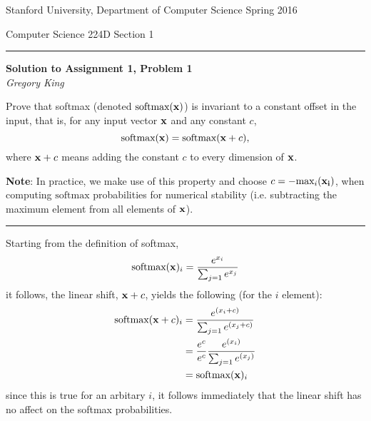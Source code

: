 \documentclass[letter,12pt]{article}
\newcommand{\myheader}[4]
{\vspace*{-0.5in}
\noindent
{#1} \hfill {#3}

\noindent
{#2} \hfill {#4}

\noindent
\rule[8pt]{\textwidth}{1pt}

\vspace{1ex} 
}  %
\newcommand{\myalgsheader}[0]
{\myheader{Stanford University, Department of Computer Science}
{Computer Science 224D}{Spring 2016}{Section 1}}
\newcommand{\myhwtitle}[3]
{\begin{center}
{\large {\bf Solution to Assignment {#1}, Problem {#2}}}\\
\medskip 
{\it {#3}} %
\end{center}}
\begin{document}
\myalgsheader

\pagestyle{plain}
\setcounter{page}{1}
\myhwtitle{1}{1}{Gregory King}

\bigskip

 Prove that softmax (denoted $\textrm{softmax}({\bf x})$)
is invariant to a constant offset in the input, that is, for any input vector
$\bf x$ and any constant $c$,
\begin{equation}
\textrm{softmax}({\bf x}) = \textrm{softmax}({\bf x} + c),
\end{equation}
where ${\bf x} + c$ means adding the constant $c$ to every dimension of ${\bf x}$.

{\bf Note}: In practice, we make use of this property and choose $c = -\textrm{max}_{i}({\bf x_i})$, when computing $\textrm{softmax}$ probabilities for numerical stability (i.e. subtracting the maximum element from all elements of ${\bf x}$).\vspace{5mm}

\noindent\rule{\textwidth}{0.4pt}\vspace{5mm}

\noindent Starting from the definition of softmax,
\begin{equation}
\textrm{softmax}({\bf x})_{i} = \frac{e^{x_{i}}}{\sum_{j=1}{e^{x_{j}}}}
\end{equation}
it follows, the linear shift, ${\bf x} + c$, yields the following (for the $i$ element):
\begin{align}
\textrm{softmax}({\bf x} + c)_{i} & = \frac{e^{(x_{i} + c)}}{\sum_{j=1}{e^{(x_{j} + c)}}}\\
                                                 & = \frac{e^{c}}{e^{c}}\frac{e^{(x_{i})}}{\sum_{j=1}{e^{(x_{j})}}}\\
                                                 & = \textrm{softmax}({\bf x})_{i}
\end{align}
since this is true for an arbitary $i$, it follows immediately that the linear shift has no affect on the softmax probabilities.


\end{document}
